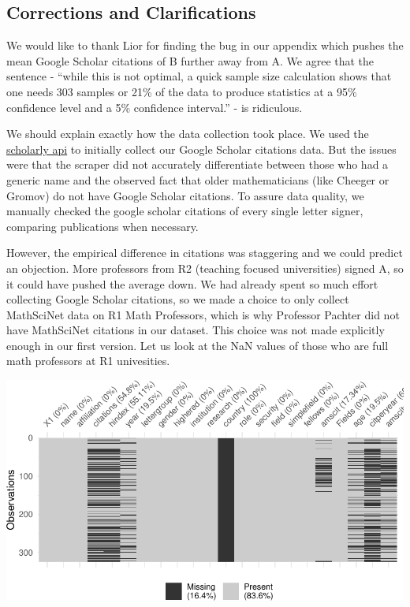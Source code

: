 \documentclass[]{article}
\begin{document}
\hypertarget{corrections-and-clarifications}{%
\subsection{Corrections and
Clarifications}\label{corrections-and-clarifications}}

We would like to thank Lior for finding the bug in our appendix which
pushes the mean Google Scholar citations of B further away from A. We
agree that the sentence - ``while this is not optimal, a quick sample
size calculation shows that one needs 303 samples or 21\% of the data to
produce statistics at a 95\% confidence level and a 5\% confidence
interval.'' - is ridiculous.

We should explain exactly how the data collection took place. We used
the \href{https://pypi.org/project/scholarly/}{scholarly api} to
initially collect our Google Scholar citations data. But the issues were
that the scraper did not accurately differentiate between those who had
a generic name and the observed fact that older mathematicians (like
Cheeger or Gromov) do not have Google Scholar citations. To assure data
quality, we manually checked the google scholar citations of every
single letter signer, comparing publications when necessary.

However, the empirical difference in citations was staggering and we
could predict an objection. More professors from R2 (teaching focused
universities) signed A, so it could have pushed the average down. We had
already spent so much effort collecting Google Scholar citations, so we
made a choice to only collect MathSciNet data on R1 Math Professors,
which is why Professor Pachter did not have MathSciNet citations in our
dataset. This choice was not made explicitly enough in our first
version. Let us look at the NaN values of those who are full math
professors at R1 univesities.

\includegraphics{Response_files/figure-latex/unnamed-chunk-3-1.pdf}
\end{document}
